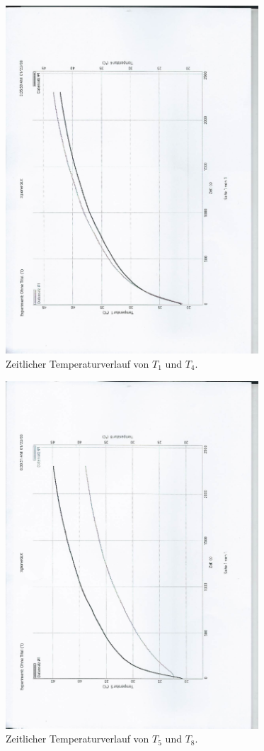 \begin{figure}
  \centering
  \includegraphics[height=13cm, angle=270]{scan-7.jpg}
  \caption{Zeitlicher Temperaturverlauf von $T_1$ und $T_4$.}
  \label{fig:1}
\end{figure}

\begin{figure}
  \centering
  \includegraphics[height=13cm, angle=270]{scan-6.jpg}
  \caption{Zeitlicher Temperaturverlauf von $T_5$ und $T_8$.}
  \label{fig:2}
\end{figure}

